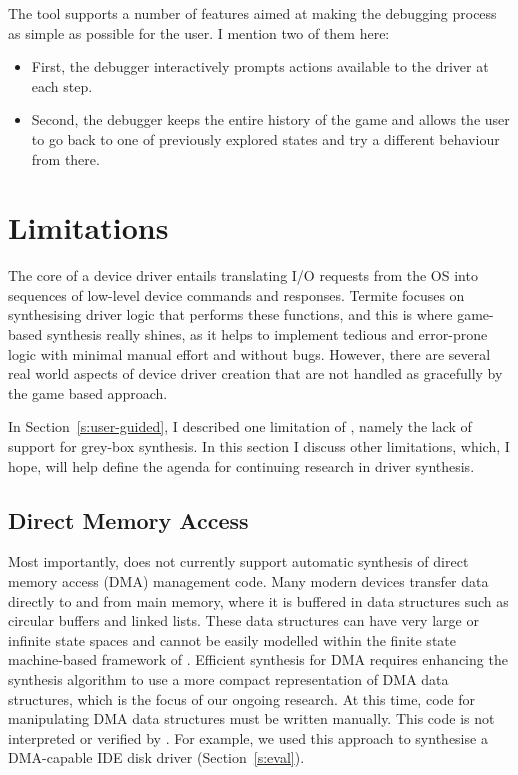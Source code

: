 The tool supports a number of features aimed at making the debugging process as simple as possible for the user. I mention two of them here: 
\begin{itemize}
    \item First, the debugger interactively prompts actions available to the driver at each step.  
    \item Second, the debugger keeps the entire history of the game and allows the user to go back to one of previously explored states and try a different behaviour from there.
\end{itemize}

\section{Limitations}\label{s:limitations}

The core of a device driver entails translating I/O requests from the OS into sequences of low-level device commands and responses. Termite focuses on synthesising driver logic that performs these functions, and this is where game-based synthesis really shines, as it helps to implement tedious and error-prone logic with minimal manual effort and without bugs. However, there are several real world aspects of device driver creation that are not handled as gracefully by the game based approach.

In Section~\ref{s:user-guided}, I described one limitation of \termite, namely the lack of support for grey-box synthesis.  In this section I discuss other limitations, which, I hope, will help define the agenda for continuing research in driver synthesis.

\subsection{Direct Memory Access}

Most importantly, \termite does not currently support automatic synthesis of direct memory access (DMA) management code.  Many modern devices transfer data directly to and from main memory, where it is buffered in data structures such as circular buffers and linked lists.  These data structures can have very large or infinite state spaces and cannot be easily modelled within the finite state machine-based framework of \termite.  Efficient synthesis for DMA requires enhancing the synthesis algorithm to use a more compact representation of DMA data structures, which is the focus of our ongoing research.  At this time, code for manipulating DMA data structures must be written manually.  This code is not interpreted or verified by \termite.  For example, we used this approach to synthesise a DMA-capable IDE disk driver (Section~\ref{s:eval}).

